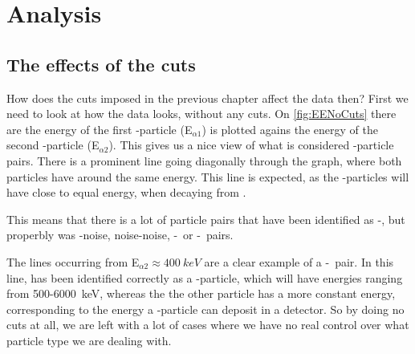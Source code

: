 \chapter{Analysis}
\section{The effects of the cuts}
How does the cuts imposed in the previous chapter affect the data then?
First we need to look at how the data looks, without any cuts. On \cref{fig:EENoCuts} there are the energy of the first \al-particle (E$_{\alpha1}$) is plotted agains the energy of the second \al-particle (E$_{\alpha2}$).
This gives us a nice view of what is considered \al-particle pairs. There is a prominent line going diagonally through the graph, where both particles have around the same energy. This line is expected, as the \al-particles will have close to equal energy, when decaying from \ber. 

This means that there is a lot of particle pairs that have been identified as \al-\al, but properbly was \al-noise, noise-noise, \al-\be\ or \be-\be\ pairs. 

The lines occurring from E$_{\alpha2} \approx \SI{400}{keV}$ are a clear example of a \al-\be\ pair. In this line,  has been identified correctly as a \al-particle, which will have energies ranging from 500-\SI{6000}{keV}, whereas the the other particle has a more constant energy, corresponding to the energy a \be-particle can deposit in a detector. So by doing no cuts at all, we are left with a lot of cases where we have no real control over what particle type we are dealing with. 

